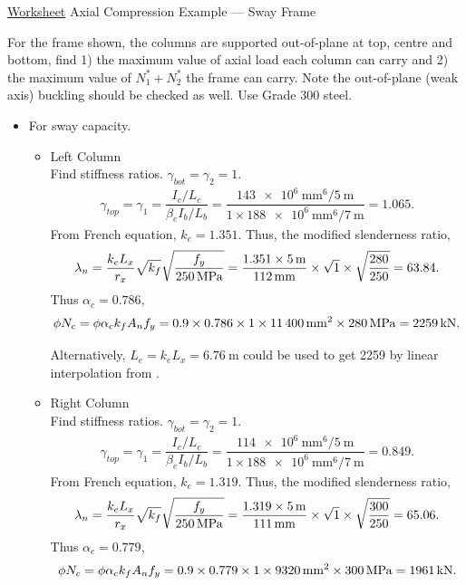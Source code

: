 \begin{exmp}\href{run:./WORKSHEET/CH04/EX4.ACSF.sm}{Worksheet}
Axial Compression Example --- Sway Frame

For the frame shown, the columns are supported out-of-plane at top, centre and bottom, find 1) the maximum value of axial load each column can carry and 2) the maximum value of $N^*_1+N^*_2$ the frame can carry.
Note the out-of-plane (weak axis) buckling should be checked as well.
Use Grade 300 steel.
\begin{figure}[H]

\end{figure}
\end{exmp}
\begin{solution}
\begin{itemize}
\item For sway capacity.

\begin{itemize}
\item Left Column\\
Find stiffness ratios. $\gamma_{bot}=\gamma_2=1$.
\begin{gather*}
\gamma_{top}=\gamma_1=\dfrac{I_c/L_c}{\beta_eI_b/L_b}=\dfrac{\SI{143e6}{\mm^6}/\SI{5}{\meter}}{1\times\SI{188e6}{\mm^6}/\SI{7}{\meter}}=1.065.
\end{gather*}
From French equation, $k_e=1.351$.
Thus, the modified slenderness ratio,
\begin{gather*}
\lambda_n=\dfrac{k_eL_x}{r_x}\sqrt{k_f}\sqrt{\dfrac{f_y}{\SI{250}{\mega\pascal}}}=\dfrac{1.351\times\SI{5}{\meter}}{\SI{112}{\milli\meter}}\times\sqrt{1}\times\sqrt{\dfrac{280}{250}}=63.84.
\end{gather*}
Thus $\alpha_c=0.786$,
\begin{gather*}
\phi{}N_c=\phi\alpha_ck_fA_nf_y=0.9\times0.786\times1\times\SI{11400}{\milli\meter^2}\times\SI{280}{\mega\pascal}=\SI{2259}{\kilo\newton}.
\end{gather*}

Alternatively, $L_e=k_eL_x=\SI{6.76}{\m}$ could be used to get \SI{2259}{\kn} by linear interpolation from .
\item Right Column\\
Find stiffness ratios. $\gamma_{bot}=\gamma_2=1$.
\begin{gather*}
\gamma_{top}=\gamma_1=\dfrac{I_c/L_c}{\beta_eI_b/L_b}=\dfrac{\SI{114e6}{\mm^6}/\SI{5}{\meter}}{1\times\SI{188e6}{\mm^6}/\SI{7}{\meter}}=0.849.
\end{gather*}
From French equation, $k_e=1.319$.
Thus, the modified slenderness ratio,
\begin{gather*}
\lambda_n=\dfrac{k_eL_x}{r_x}\sqrt{k_f}\sqrt{\dfrac{f_y}{\SI{250}{\mega\pascal}}}=\dfrac{1.319\times\SI{5}{\meter}}{\SI{111}{\milli\meter}}\times\sqrt{1}\times\sqrt{\dfrac{300}{250}}=65.06.
\end{gather*}
Thus $\alpha_c=0.779$,
\begin{gather*}
\phi{}N_c=\phi\alpha_ck_fA_nf_y=0.9\times0.779\times1\times\SI{9320}{\milli\meter^2}\times\SI{300}{\mega\pascal}=\SI{1961}{\kilo\newton}.
\end{gather*}


\end{itemize}
\end{itemize}
\end{solution}

